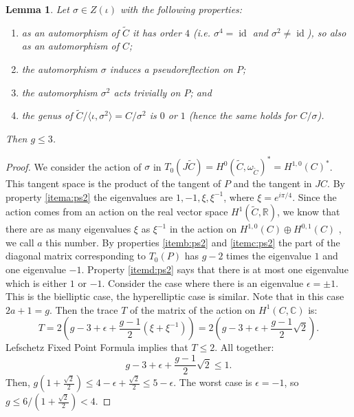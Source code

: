 \documentclass[preprint,12pt]{amsart}
\def\tC{\ensuremath{\tilde{C}}}
\DeclareMathOperator{\id}{id}
\theoremstyle{plain}
\newtheorem{lemma}[lemma]{Lemma}
\theoremstyle{definition}
\begin{document}
\begin{lemma}\label{lem:pseudoOford2}
Let $\sigma \in Z(\iota)$ with the following properties:
\begin{enumerate}
    \item\label{itema:ps2} as an automorphism of $\widetilde C$ it has order $4$ (i.e. $\sigma ^4=\id$ and $\sigma ^2\neq \id$), so also as an automorphism of $C$;
    \item\label{itemb:ps2} the automorphism $\sigma $ induces a pseudoreflection on $P$;
    \item\label{itemc:ps2} the automorphism $\sigma ^2$ acts trivially on $P$; and
    \item\label{itemd:ps2} the genus of $\tC/\langle \iota,\sigma^2\rangle =C/\sigma^2$ is $0$ or $1$ (hence the same holds for $C/\sigma$).
\end{enumerate}
Then $g\le 3$.%
\end{lemma}
\begin{proof}
We consider the action of $\sigma $ in $T_0(J\widetilde C)=H^0(\widetilde C,\omega_{\widetilde C})^*=H^{1,0}(C)^*$.
This tangent space is the product of the tangent of $P$ and the tangent in $JC$.
By property \eqref{itema:ps2} the eigenvalues are $1, -1, \xi, \xi^{-1}$, where $\xi=e^{i\pi/4}$. Since the action comes from an action on the real vector space $H^1(\widetilde C, \mathbb R)$,%
we know that there are as many eigenvalues $\xi$ as $\xi^{-1}$ in the action on $H^{1,0}(C)\oplus H^{0,1}(C)$ , we call $a$ this number.
By properties \eqref{itemb:ps2} and \eqref{itemc:ps2} the part of the diagonal matrix corresponding to $T_0(P)$ has $g-2$ times the eigenvalue $1$ and one eigenvalue $-1$.
Property \eqref{itemd:ps2} says that there is at most one eigenvalue which is either $1$  or $-1$.
Consider the case where there is an eigenvalue $\epsilon =\pm 1$.
This is the bielliptic case, the hyperelliptic case is similar.
Note that in this case $2a+1=g$.
Then the trace $T$ of the matrix of the action on $H^1(C,\mathbb C)$ is:  
    \[
    T=2(g-3 +\epsilon +\frac{g-1}2  (\xi + \xi^{-1}))=2(g-3+\epsilon+\frac{g-1}2 \sqrt 2).
    \]
Lefschetz Fixed Point Formula implies that $T\leq 2$.
All together:
    \[
    g-3+\epsilon+\frac{g-1}2 \sqrt 2\le 1.
    \]
    Then, $g (1+ \frac {\sqrt 2}2)\le 4-\epsilon +\frac {\sqrt 2}2\le 5-\epsilon .$ The worst case is $\epsilon =-1$, so $g\le 6/(1+ \frac {\sqrt 2}2)<4$.
\end{proof}
\end{document}
